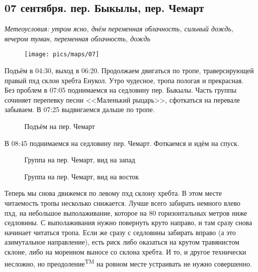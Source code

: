 \subsection{07 сентября. пер. Быкылы, пер. Чемарт}
\textit{Метеоусловия: утром ясно, днём переменная облачность, сильный дождь, вечером туман, переменная облачность, дождь}

\begin{figure}[h!]
	\centering
	\texttt{[image: pics/maps/07]}
	\label{fig:07}
\end{figure}

Подъём в 04:30, выход в 06:20. Продолжаем двигаться по тропе, траверсирующей правый пхд склон хребта Енукол. Утро чудесное, тропа пологая и прекрасная. Без проблем в 07:05 поднимаемся на седловину пер. Быкылы. Часть группы сочиняет перепевку песни <<Маленький рыцарь>>, сфоткаться на перевале забываем. В 07:25 выдвигаемся дальше по тропе.

\begin{figure}[h!]
	\centering
	\caption{Подъём на пер. Чемарт}
	\label{fig:toward_chemart}
\end{figure}

В 08:45 поднимаемся на седловину пер. Чемарт. Фоткаемся и идём на спуск.

\begin{figure}[h!]
	\centering
	\caption{Группа на пер. Чемарт, вид на запад}
	\label{fig:chemart_west}
\end{figure}


\begin{figure}[h!]
	\centering
	\caption{Группа на пер. Чемарт, вид на восток}
	\label{fig:chemart_east}
\end{figure}


Теперь мы снова движемся по левому пхд склону хребта. В этом месте читаемость тропы несколько снижается. Лучше всего забирать немного влево пхд, на небольшое выполаживание, которое на 80 горизонтальных метров ниже седловины. С выполаживания нужно повернуть круто направо, и там сразу снова начинает читаться тропа. Если же сразу с седловины забирать вправо (а это азимутальное направление), есть риск либо оказаться на крутом травянистом склоне, либо на моренном выносе со склона хребта. И то, и другое технически несложно, но преодоление\textsuperscript{TM} на ровном месте устраивать не нужно совершенно.

